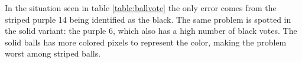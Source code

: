 In the situation seen in table \ref{table:ballvote} the only error comes from the striped purple 14 being identified as the black. The same problem is spotted in the solid variant: the purple 6, which also has a high number of black votes. The solid balls has more colored pixels to represent the color, making the problem worst among striped balls.
